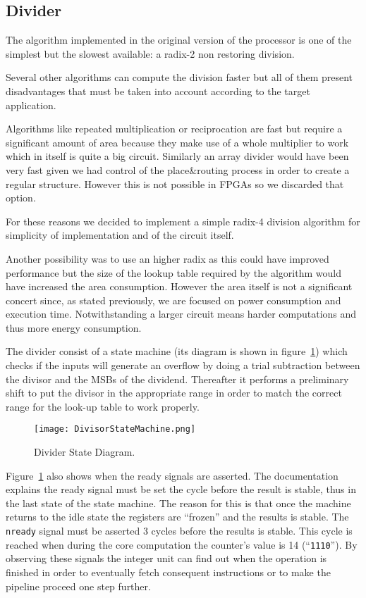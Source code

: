\subsection{Divider}
\label{sec:div}


The algorithm implemented in the original version of the processor is one of the simplest but the
slowest available: a radix-2 non restoring division.

Several other algorithms can compute the division faster but all of them present disadvantages
that must be taken into account according to the target application.

Algorithms like repeated multiplication or reciprocation are fast but require a significant amount
of area because they make use of a whole multiplier to work which in itself is quite a big circuit.
Similarly an array divider would have been very fast given we had control of the
place\&routing process in order to create a regular structure. However this is not possible in FPGAs so we discarded that option. 

For these reasons we decided to implement
a simple radix-4 division algorithm for simplicity of implementation and of the circuit itself.

Another possibility was to use an higher radix as this could have improved performance but the size of the lookup table required
by the algorithm would have increased the area consumption.
However the area itself is not a significant concert since, as stated previously, we are focused on power consumption and execution time. Notwithstanding a larger circuit means harder computations and thus more energy consumption.

The divider consist of a state machine (its diagram is shown in figure~\ref{fig:div_state_dia}) which checks if the inputs will
generate an overflow by doing a trial subtraction between the divisor and the MSBs of the dividend. Thereafter it performs a preliminary shift to put the divisor in the appropriate range in order to match the correct range for the look-up table to work properly.


\begin{figure}[H]
\centering
\texttt{[image: DivisorStateMachine.png]}
\caption{Divider State Diagram.}
\label{fig:div_state_dia}
\end{figure}

Figure~\ref{fig:div_state_dia} also shows when the ready signals are asserted. The documentation~\cite{doc} explains the ready signal must be set the cycle before the result is stable, thus in the last state of the state machine. The reason for this is that once the machine returns to the idle state the registers are ``frozen'' and the results is stable. The \texttt{nready} signal must be asserted 3 cycles before the results is stable. This cycle is reached when during the core computation the counter's value is 14 (``\texttt{1110}''). 
By observing these signals the integer unit can find out when the operation is finished in order to eventually fetch consequent instructions or to make the pipeline proceed one step further.

